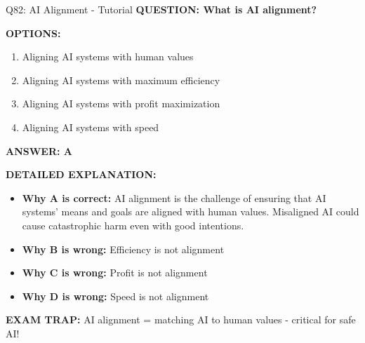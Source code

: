 \documentclass[8pt]{beamer}
\begin{document}
	\begin{frame}{Q82: AI Alignment - Tutorial}
		\fontsize{6.5}{7.5}\selectfont
		\textbf{QUESTION: What is AI alignment?}
		
		\vspace{0.1cm}
		\textbf{OPTIONS:}
		\begin{enumerate}
			\item Aligning AI systems with human values
			\item Aligning AI systems with maximum efficiency
			\item Aligning AI systems with profit maximization
			\item Aligning AI systems with speed
		\end{enumerate}
		
		\vspace{0.1cm}
		\textcolor{myblue}{\textbf{ANSWER: A}}
		
		\vspace{0.1cm}
		\textbf{DETAILED EXPLANATION:}
		\begin{itemize}
			\item \textbf{Why A is correct:} AI alignment is the challenge of ensuring that AI systems' means and goals are aligned with human values. Misaligned AI could cause catastrophic harm even with good intentions.
			\item \textbf{Why B is wrong:} Efficiency is not alignment\item \textbf{Why C is wrong:} Profit is not alignment
			\item \textbf{Why D is wrong:} Speed is not alignment
		\end{itemize}
		
		\textcolor{myred}{\textbf{EXAM TRAP:}} AI alignment = \textcolor{myblue}{matching AI to human values} - critical for safe AI!
	\end{frame}
	
\end{document}
